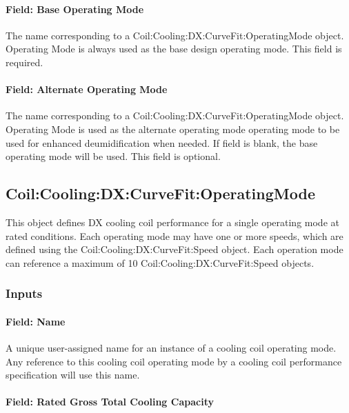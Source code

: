 \paragraph{Field: Base Operating Mode}\label{field-base-operating-mode}

The name corresponding to a Coil:Cooling:DX:CurveFit:OperatingMode object. Operating Mode is always used as the base design operating mode. This field is required.

\paragraph{Field: Alternate Operating Mode}\label{field-alternate-operating-mode}

The name corresponding to a Coil:Cooling:DX:CurveFit:OperatingMode object. Operating Mode is used as the alternate operating mode operating mode to be used for enhanced deumidification when needed. If field is blank, the base operating mode will be used. This field is optional.

\subsection{Coil:Cooling:DX:CurveFit:OperatingMode}\label{coilcoolingdxcurvefitoperatingmode}

This object defines DX cooling coil performance for a single operating mode at rated conditions. Each operating mode may have one or more speeds, which are defined using the Coil:Cooling:DX:CurveFit:Speed object. Each operation mode can reference a maximum of 10 Coil:Cooling:DX:CurveFit:Speed objects.

\subsubsection{Inputs}\label{inputs-03}

\paragraph{Field: Name}\label{field-name-03}

A unique user-assigned name for an instance of a cooling coil operating mode. Any reference to this cooling coil operating mode by a cooling coil performance specification will use this name.

\paragraph{Field: Rated Gross Total Cooling Capacity}\label{field-rated-gross-total-cooling-capacity-1}

